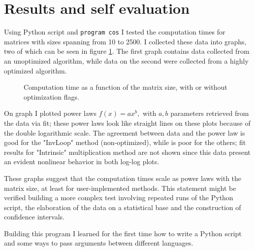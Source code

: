 \documentclass[a4paper]{article}
\begin{document}
\section*{Results and self evaluation}
Using Python script and \lstinline{program cos} I tested the computation times for matrices with sizes spanning from 10 to 250{}0.
I collected these data into graphs, two of which can be seen in figure \ref{fig:timevsize}.
The first graph contains data collected from an unoptimized algorithm, while data on the second were collected from a highly optimized algorithm.
\begin{figure}[h]
\centering
{}
\caption{Computation time as a function of the matrix size, with or without optimization flags.}
\label{fig:timevsize}
\end{figure}
On graph I plotted power laws $f(x) = ax^b,$ with $a,b$ parameters retrieved from the data via fit; these power laws look like straight lines on these plots because of the double logarithmic scale.
The agreement between data and the power law is good for the "InvLoop" method (non-optimized), while is poor for the others; fit results for "Intrinsic" multiplication method are not shown since this data present an evident nonlinear behavior in both log-log plots.

\noindent These graphs suggest that the computation times scale as power laws with the matrix size, at least for user-implemented methods.
This statement might be verified building a more complex test involving repeated runs of the Python script, the elaboration of the data on a statistical base and the construction of confidence intervals.

Building this program I learned for the first time how to write a Python script and some ways to pass arguments between different languages.
\end{document}
